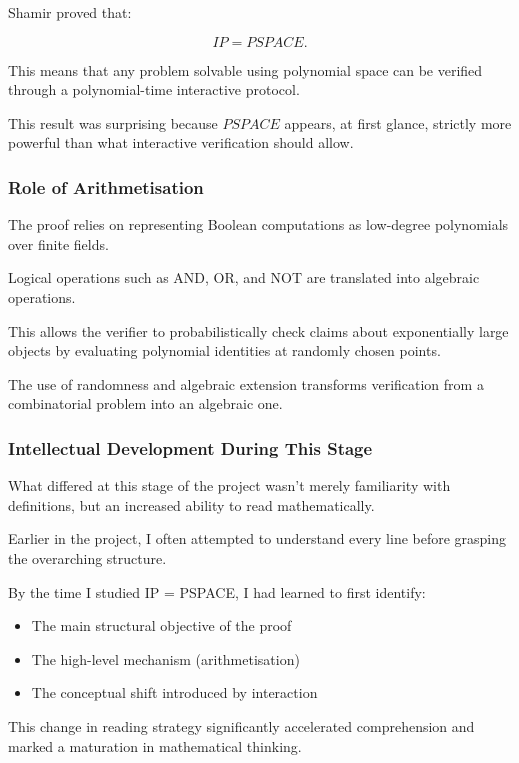 \documentclass[12pt]{article}
\begin{document}
Shamir proved that:

\[
IP = PSPACE.
\]

This means that any problem solvable using polynomial space can be verified through a polynomial-time interactive protocol.

This result was surprising because $PSPACE$ appears, at first glance, strictly more powerful than what interactive verification should allow.

\subsubsection*{Role of Arithmetisation}

The proof relies on representing Boolean computations as low-degree polynomials over finite fields.

Logical operations such as AND, OR, and NOT are translated into algebraic operations.

This allows the verifier to probabilistically check claims about exponentially large objects by evaluating polynomial identities at randomly chosen points.

The use of randomness and algebraic extension transforms verification from a combinatorial problem into an algebraic one.

\subsubsection*{Intellectual Development During This Stage}

What differed at this stage of the project wasn't merely familiarity with definitions, but an increased ability to read mathematically.

Earlier in the project, I often attempted to understand every line before grasping the overarching structure.

By the time I studied IP = PSPACE, I had learned to first identify:

\begin{itemize}
\item The main structural objective of the proof
\item The high-level mechanism (arithmetisation)
\item The conceptual shift introduced by interaction
\end{itemize}

This change in reading strategy significantly accelerated comprehension and marked a maturation in mathematical thinking.
\end{document}
